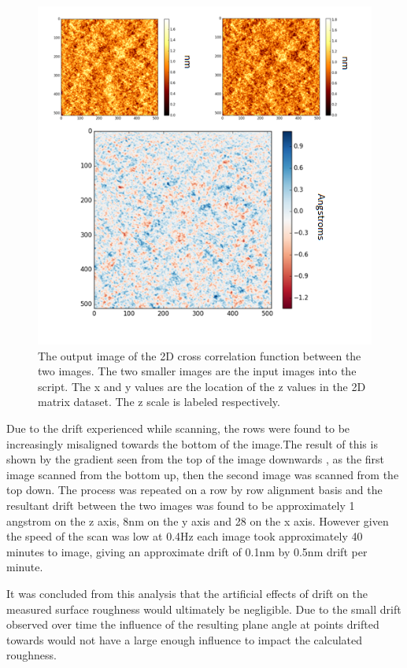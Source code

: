 \begin{figure}[h]     %
        \begin{center}
          \includegraphics[width=120mm]{chapter3/CrossCor.png}
\end{center}
\caption{The output image of the 2D cross correlation function between the two images. The two smaller images are the input images into the script. The x and y values are the location of the z values in the 2D matrix dataset. The z scale is labeled respectively.}
\label{fig:CrossCor}                 %
\end{figure}

Due to the drift experienced while scanning, the rows were found to be increasingly misaligned towards the bottom of the image.The result of this is shown by the gradient seen from the top of the image downwards , as the first image scanned from the bottom up, then the second image was scanned from the top down. The process was repeated on a row by row alignment basis and the resultant drift between the two images was found to be approximately 1 angstrom on the z axis, 8nm on the y axis and 28 on the x axis. However given the speed of the scan was low at 0.4Hz each image took approximately 40 minutes to image, giving an approximate drift of 0.1nm by 0.5nm drift per minute.

It was concluded from this analysis that the artificial effects of drift on the measured surface roughness would ultimately be negligible. Due to the small drift observed over time the influence of the resulting plane angle at points drifted towards would not have a large enough influence to impact the calculated roughness.

